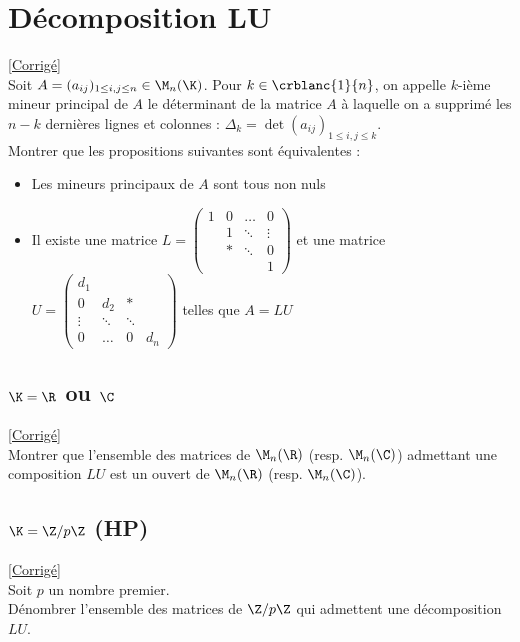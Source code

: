 \documentclass[8pt]{book}
\begin{document}
\section{Décomposition LU }
\label{Décomposition LU}
\textcolor{blue}{\hyperref[Décomposition LU corrigé]{[Corrigé]}}\\
Soit $A=(a_{ij})_{1\leq i,j\leq n}\in \M_n(\K)$. Pour $k\in \crblanc{1}{n}$, on appelle $k$-ième mineur principal de $A$ le déterminant de la matrice $A$ à laquelle on a supprimé les $n-k$ dernières lignes et colonnes : $\Delta_k=\det(a_{ij})_{1\leq i,j\leq k}$.\\
Montrer que les propositions suivantes sont équivalentes :
\begin{itemize}
	\item Les mineurs principaux de $A$ sont tous non nuls
	\item Il existe une matrice 
	$L=\begin{pmatrix}
		1&0&\dots&0\\
		&1&\ddots&\vdots\\
		&*&\ddots&0\\
		&&&1
	\end{pmatrix}$
	et une matrice $U=
	\begin{pmatrix}
		d_1&&&\\
		0&d_2&*&\\
		\vdots&\ddots&\ddots&\\
		0&\dots&0&d_n
	\end{pmatrix}$
	telles que $A=LU$
\end{itemize}

\subsection{$\K=\R$ ou $\C$ } 
\label{K=R ou C}
\textcolor{blue}{\hyperref[K=R ou C corrigé]{[Corrigé]}}\\
Montrer que l'ensemble des matrices de $\M_n(\R)$ (resp. $\M_n(\C)$) admettant une composition $LU$ est un ouvert de $\M_n(\R)$ (resp. $\M_n(\C)$).

\subsection{$\K=\Z/p\Z$  (HP)}
\label{K=Z/pZ}
\textcolor{blue}{\hyperref[K=Z/pZ corrigé]{[Corrigé]}}\\
Soit $p$ un nombre premier.\\
Dénombrer l'ensemble des matrices de $\Z/p\Z$ qui admettent une décomposition $LU$.
\end{document}
